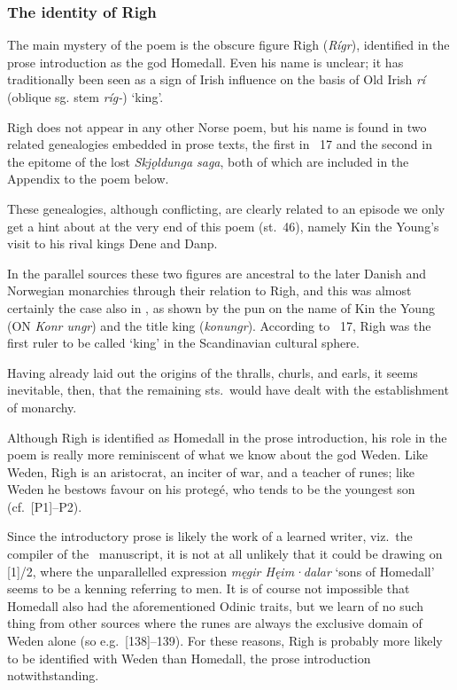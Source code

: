 \subsubsection{The identity of Righ}

The main mystery of the poem is the obscure figure Righ (\emph{Rígr}), identified in the prose introduction as the god Homedall.  Even his name is unclear; it has traditionally been seen as a sign of Irish influence on the basis of Old Irish \emph{rí} (oblique sg. stem \emph{ríg-}) ‘king’.

Righ does not appear in any other Norse poem, but his name is found in two related genealogies embedded in prose texts, the first in \YnglingaSaga\ 17 and the second in the epitome of the lost \emph{Skjǫldunga saga}, both of which are included in the Appendix to the poem below.

These genealogies, although conflicting, are clearly related to an episode we only get a hint about at the very end of this poem (st.~46), namely Kin the Young’s visit to his rival kings Dene and Danp.

In the parallel sources these two figures are ancestral to the later Danish and Norwegian monarchies through their relation to Righ, and this was almost certainly the case also in \Rigsthula, as shown by the pun on the name of Kin the Young (ON \emph{Konr ungr}) and the title king (\emph{konungr}).  According to \YnglingaSaga\ 17, Righ was the first ruler to be called ‘king’ in the Scandinavian cultural sphere.

Having already laid out the origins of the thralls, churls, and earls, it seems inevitable, then, that the remaining sts.~would have dealt with the establishment of monarchy.

Although Righ is identified as Homedall in the prose introduction, his role in the poem is really more reminiscent of what we know about the god Weden.  Like Weden, Righ is an aristocrat, an inciter of war, and a teacher of runes; like Weden he bestows favour on his protegé, who tends to be the youngest son (cf.~[P1]--P2).

Since the introductory prose is likely the work of a learned writer, viz.~the compiler of the \Wormianus\ manuscript, it is not at all unlikely that it could be drawing on [1]/2, where the unparallelled expression \emph{męgir Hęim·dalar} ‘sons of Homedall’ seems to be a kenning referring to men.  It is of course not impossible that Homedall also had the aforementioned Odinic traits, but we learn of no such thing from other sources where the runes are always the exclusive domain of Weden alone (so e.g.~[138]--139).  For these reasons, Righ is probably more likely to be identified with Weden than Homedall, the prose introduction notwithstanding.

